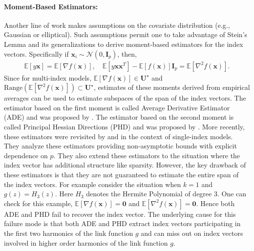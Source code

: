 \documentclass[final,12pt]{colt2018} %
\newcommand{\E}{\mathbb{E}}
\newcommand{\gauss}[2]{\mathcal{N}\left( #1,#2 \right)}
\renewcommand\v[1]{{\ensuremath{\boldsymbol{#1}}}}
\begin{document}
\paragraph{Moment-Based Estimators:} 
Another line of work makes assumptions on the covariate distribution (e.g., Gaussian or elliptical). Such assumptions permit one to take advantage of Stein's Lemma and its generalizations to derive moment-based estimators for the index vectors. Specifically if $\v x_i \sim \gauss{0}{\v I_p}$, then,
\begin{align*}
    \E[ y \v x] = \E[\nabla f(\v x)], \quad \E[y \v x \v x^T ]  - \E[f(\v x)] \v I_p = \E[\nabla^2 f(\v x)].
\end{align*}
Since for multi-index models, $\E[\nabla f(\v x) ] \in \mathcal{\v U^\star}$ and $\text{Range}(\E[\nabla^2 f(\v x)]) \subset \mathcal{\v U}^\star$, estimates of these moments derived from empirical averages can be used to estimate subspaces of the span of the index vectors. The estimator based on the first moment is called Average Derivative Estimator (ADE) and was proposed by \citet{brillinger2012generalized}. The estimator based on the second moment is called Principal Hessian Directions (PHD) and was proposed by \citet{li1992principal}. More recently, these estimators were revisited by \citet{plan2017high} and \citet{neykov2016agnostic} in the context of single-index models. They analyze these estimators providing non-asymptotic bounds with explicit dependence on $p$. They also extend these estimators to the situation where the index vector has additional structure like sparsity. However, the key drawback of these estimators is that they are not guaranteed to estimate the entire span of the index vectors. For example consider the situation when $k=1$ and $g(z) = H_3(z)$. Here $H_3$ denotes the Hermite Polynomial of degree 3. One can check for this example, $\E[\nabla f(\v x)] = \v 0$ and $\E[\nabla^2 f(\v x)] = \v 0$. Hence both ADE and PHD fail to recover the index vector. The underlying cause for this failure mode is that both ADE and PHD extract index vectors participating in the first two harmonics of the link function $g$ and can miss out on index vectors involved in higher order harmonics of the link function $g$. 
\end{document}
